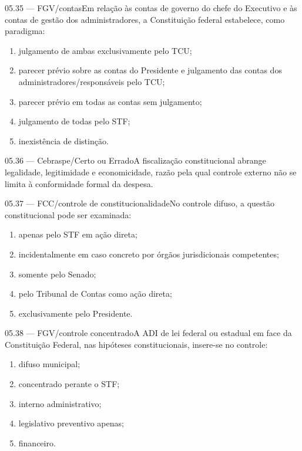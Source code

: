 \begin{questao}{ 05.35 — FGV/contas}Em relação às contas de governo do chefe do Executivo e às contas de gestão dos administradores, a Constituição federal estabelece, como paradigma:\begin{enumerate}[label=\Alph*)]\item julgamento de ambas exclusivamente pelo TCU;\item parecer prévio sobre as contas do Presidente e julgamento das contas dos administradores/responsáveis pelo TCU;\item parecer prévio em todas as contas sem julgamento;\item julgamento de todas pelo STF;\item inexistência de distinção.\end{enumerate}\end{questao}
\begin{questao}{ 05.36 — Cebraspe/Certo ou Errado}A fiscalização constitucional abrange legalidade, legitimidade e economicidade, razão pela qual controle externo não se limita à conformidade formal da despesa.\end{questao}
\begin{questao}{ 05.37 — FCC/controle de constitucionalidade}No controle difuso, a questão constitucional pode ser examinada:\begin{enumerate}[label=\Alph*)]\item apenas pelo STF em ação direta;\item incidentalmente em caso concreto por órgãos jurisdicionais competentes;\item somente pelo Senado;\item pelo Tribunal de Contas como ação direta;\item exclusivamente pelo Presidente.\end{enumerate}\end{questao}
\begin{questao}{ 05.38 — FGV/controle concentrado}A ADI de lei federal ou estadual em face da Constituição Federal, nas hipóteses constitucionais, insere-se no controle:\begin{enumerate}[label=\Alph*)]\item difuso municipal;\item concentrado perante o STF;\item interno administrativo;\item legislativo preventivo apenas;\item financeiro.\end{enumerate}\end{questao}
